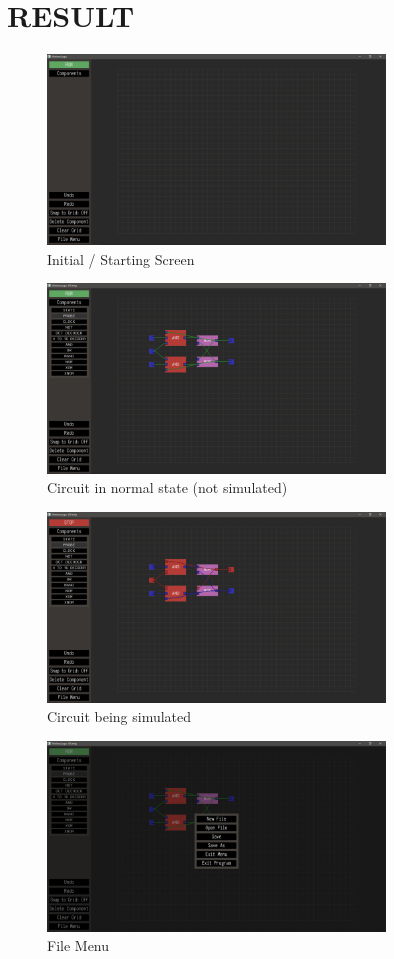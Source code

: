 \documentclass[report.tex]{subfiles}
\begin{document}
\chapter{RESULT}
\begin{figure}[H]
    \centering
    \includegraphics[width=0.8\textwidth]{graphics/initial_screen.png}
    \caption{Initial / Starting Screen}
\end{figure}
\begin{figure}[H]
    \centering
    \includegraphics[width=0.8\textwidth]{graphics/jkff_normal.png}
    \caption{Circuit in normal state (not simulated)}
\end{figure}
\begin{figure}[H]
    \centering
    \includegraphics[width=0.8\textwidth]{graphics/jkff_simulating.png}
    \caption{Circuit being simulated}
\end{figure}
\begin{figure}[H]
    \centering
    \includegraphics[width=0.8\textwidth]{graphics/file_menu.png}
    \caption{File Menu}
\end{figure}
\end{document}
